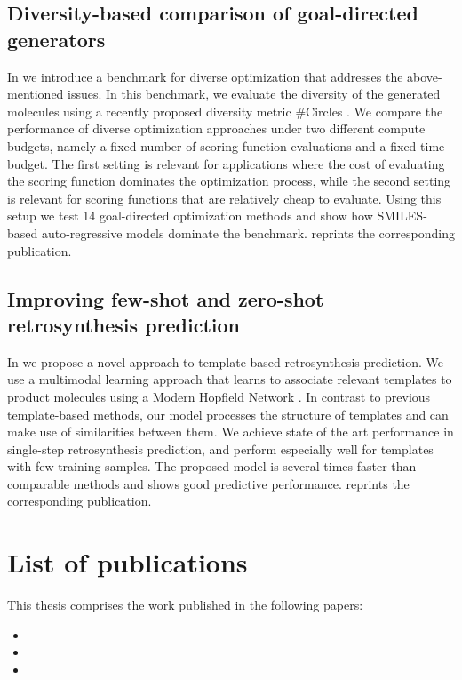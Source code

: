 \subsection{Diversity-based comparison of goal-directed generators\label{sec:divopt}} In
\citep{renzDiverseHitsNovo2024} we introduce a benchmark for diverse optimization that addresses the
above-mentioned issues. In this benchmark, we evaluate the diversity of the generated molecules
using a recently proposed diversity metric \#Circles \citep{xieHowMuchSpace2023}. We compare the
performance of diverse optimization approaches under two different compute budgets, namely a fixed
number of scoring function evaluations and a fixed time budget. The first setting is relevant for
applications where the cost of evaluating the scoring function dominates the optimization process,
while the second setting is relevant for scoring functions that are relatively cheap to evaluate.
Using this setup we test 14 goal-directed optimization methods and show how SMILES-based
auto-regressive models dominate the benchmark.  reprints the corresponding
publication.

\subsection{Improving few-shot and zero-shot retrosynthesis prediction}
In \citep{seidlImprovingFewZeroShot2022} we propose a novel approach to template-based
retrosynthesis prediction. We use a multimodal learning approach that learns to associate relevant
templates to product molecules using a Modern Hopfield Network
\citep{ramsauerHopfieldNetworksAll2020}. In contrast to previous template-based methods, our model
processes the structure of templates and can make use of similarities between them. We achieve state
of the art performance in single-step retrosynthesis prediction, and perform especially well for
templates with few training samples. The proposed model is several times faster than comparable
methods and shows good predictive performance.  reprints the corresponding
publication.

\section{List of publications\label{sec:publications}} This thesis comprises the work published in
the following papers:

\begin{itemize}
      \item {}
      \item {}
      \item {}
\end{itemize}

